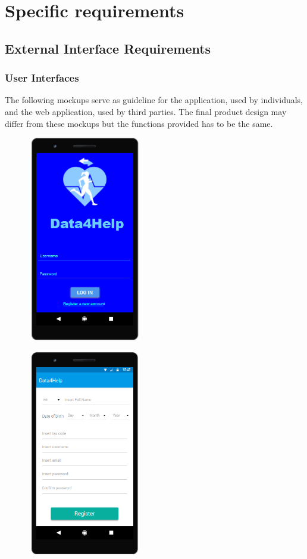 \chapter{Specific requirements}

\section{External Interface Requirements}
\subsection{User Interfaces}
The following mockups serve as guideline for the application, used by individuals, and the web application, used by third parties. The final product design may differ from these mockups but the functions provided has to be the same.


\begin{figure}[H]
\centering
\begin{minipage}{.5\textwidth}
  \centering
  \includegraphics[width=5cm,height=9cm]{resources/Screen/Individuallogin.png}
  \label{fig:App Login}
\end{minipage}%
\begin{minipage}{.5\textwidth}
  \centering
  \includegraphics[width=5cm,height=9cm]{resources/Screen/RegistrationIndividual.png}
  \label{fig:App Registration}
\end{minipage}
\end{figure}


